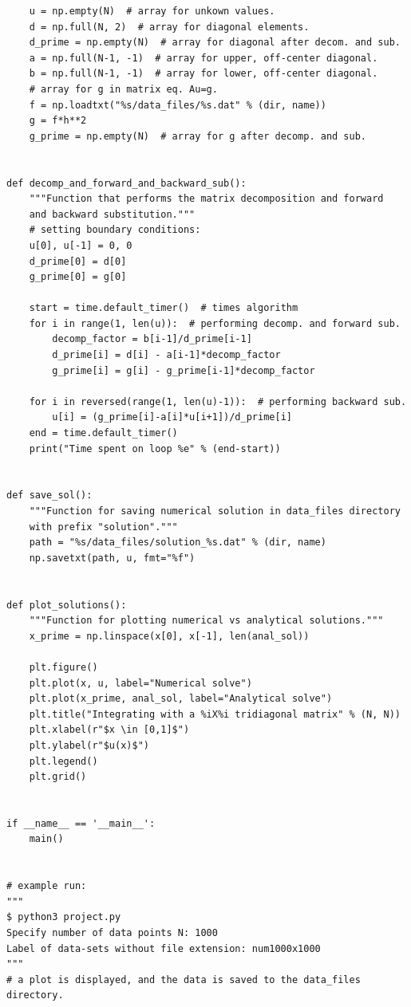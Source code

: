 \documentclass[english,notitlepage,reprint]{revtex4-1}  %
\begin{document}
\begin{lstlisting}
    u = np.empty(N)  # array for unkown values.
    d = np.full(N, 2)  # array for diagonal elements.
    d_prime = np.empty(N)  # array for diagonal after decom. and sub.
    a = np.full(N-1, -1)  # array for upper, off-center diagonal.
    b = np.full(N-1, -1)  # array for lower, off-center diagonal.
    # array for g in matrix eq. Au=g.
    f = np.loadtxt("%s/data_files/%s.dat" % (dir, name))
    g = f*h**2
    g_prime = np.empty(N)  # array for g after decomp. and sub.


def decomp_and_forward_and_backward_sub():
    """Function that performs the matrix decomposition and forward
    and backward substitution."""
    # setting boundary conditions:
    u[0], u[-1] = 0, 0
    d_prime[0] = d[0]
    g_prime[0] = g[0]

    start = time.default_timer()  # times algorithm
    for i in range(1, len(u)):  # performing decomp. and forward sub.
        decomp_factor = b[i-1]/d_prime[i-1]
        d_prime[i] = d[i] - a[i-1]*decomp_factor
        g_prime[i] = g[i] - g_prime[i-1]*decomp_factor

    for i in reversed(range(1, len(u)-1)):  # performing backward sub.
        u[i] = (g_prime[i]-a[i]*u[i+1])/d_prime[i]
    end = time.default_timer()
    print("Time spent on loop %e" % (end-start))


def save_sol():
    """Function for saving numerical solution in data_files directory
    with prefix "solution"."""
    path = "%s/data_files/solution_%s.dat" % (dir, name)
    np.savetxt(path, u, fmt="%f")


def plot_solutions():
    """Function for plotting numerical vs analytical solutions."""
    x_prime = np.linspace(x[0], x[-1], len(anal_sol))

    plt.figure()
    plt.plot(x, u, label="Numerical solve")
    plt.plot(x_prime, anal_sol, label="Analytical solve")
    plt.title("Integrating with a %iX%i tridiagonal matrix" % (N, N))
    plt.xlabel(r"$x \in [0,1]$")
    plt.ylabel(r"$u(x)$")
    plt.legend()
    plt.grid()


if __name__ == '__main__':
    main()


# example run:
"""
$ python3 project.py
Specify number of data points N: 1000
Label of data-sets without file extension: num1000x1000
"""
# a plot is displayed, and the data is saved to the data_files directory.

\end{lstlisting}
\end{document}
